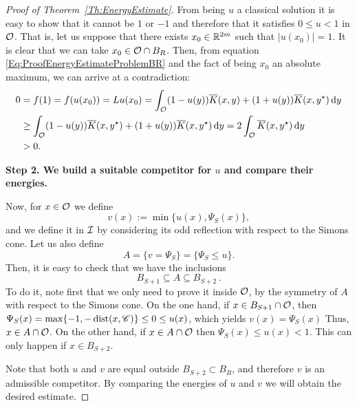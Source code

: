 \begin{proof}[Proof of Theorem~\ref{Th:EnergyEstimate}]
From being $u$ a classical solution it is easy to show that it cannot be $1$ or $-1$ and therefore that it satisfies $0\leq u < 1$ in $\mathcal{O}$. That is, let us suppose that there exists $x_0\in\mathbb{R}^{2m}$ such that $|u(x_0)|=1$. It is clear that we can take $x_0\in\mathcal{O}\cap B_R$. Then, from equation \eqref{Eq:ProofEnergyEstimateProblemBR} and the fact of being $x_0$ an absolute maximum, we can arrive at a contradiction:
\begin{align*}
0 &= f(1) = f(u(x_0)) = Lu(x_0) = \int_{\mathcal{O}} (1-u(y)) \overline{K}(x,y) + (1+u(y)) \overline{K}(x,y^\star)  \,\mathrm{d} y \\
&\geq \int_{\mathcal{O}} (1-u(y)) \overline{K}(x,y^\star) + (1+u(y)) \overline{K}(x,y^\star)  \,\mathrm{d} y = 2\int_{\mathcal{O}} \overline{K}(x,y^\star) \,\mathrm{d} y\\
&>0.
\end{align*}

\textbf{Step 2. We build a suitable competitor for $u$ and compare their energies.}

Now, for $x\in \mathcal{O}$ we define
$$ 
v(x) := \min\{u(x),\Psi_S(x)\}, 
$$
and we define it in $\mathcal{I}$ by considering its odd reflection with respect to the Simons cone. Let us also define
$$
A = \{v=\Psi_S\} = \{\Psi_S \leq u\}. 
$$
Then, it is easy to check that we have the inclusions
\begin{equation}
\label{Eq:EnergyEstimateProofInclusionsA}
	B_{S+1} \subseteq A \subseteq B_{S+2}\,.
\end{equation}
To do it, note first that we only need to prove it inside $\mathcal{O}$, by the symmetry of $A$ with respect to the Simons cone. On the one hand, if $ x\in B_{S+1}\cap \mathcal{O}$, then $\Psi_S(x) = \max\{-1,-\operatorname{dist}(x,\mathscr{C})\} \leq 0 \leq u(x)$, which yields $v(x) = \Psi_S(x)$ Thus, $x\in A\cap \mathcal{O}$. On the other hand, if $ x\in A\cap \mathcal{O}$ then $\Psi_S(x) \leq u(x) < 1$. This can only happen if $x\in B_{S+2}$.

Note that both $u$ and $v$ are equal outside $B_{S+2} \subset B_R$, and therefore $v$ is an admissible competitor. By comparing the energies of $u$ and $v$ we will obtain the desired estimate. 


\end{proof}
